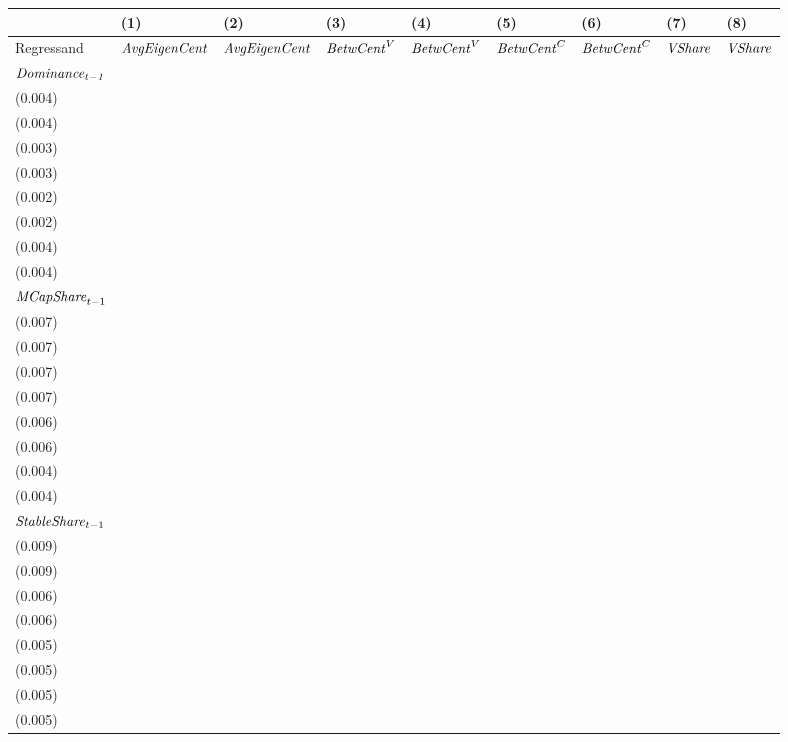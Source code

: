 \begin{tabular}{lllllllll}
\toprule
{} &                                  (1) &                                  (2) &                                  (3) &                                  (4) &                                 (5) &                                 (6) &                                 (7) &                                 (8) \\
\midrule
Regressand                   &                 ${\it AvgEigenCent}$ &                 ${\it AvgEigenCent}$ &                   ${\it BetwCent}^V$ &                   ${\it BetwCent}^V$ &                  ${\it BetwCent}^C$ &                  ${\it BetwCent}^C$ &                      ${\it VShare}$ &                      ${\it VShare}$ \\
$\it Dominance_{t-1}$        &   \makecell{$0.713^{***}$ \\(0.004)} &   \makecell{$0.713^{***}$ \\(0.004)} &   \makecell{$0.825^{***}$ \\(0.003)} &   \makecell{$0.825^{***}$ \\(0.003)} &  \makecell{$0.926^{***}$ \\(0.002)} &  \makecell{$0.926^{***}$ \\(0.002)} &  \makecell{$0.717^{***}$ \\(0.004)} &  \makecell{$0.717^{***}$ \\(0.004)} \\
${{\it MCapShare}}_{t-1}$    &  \makecell{$-0.031^{***}$ \\(0.007)} &  \makecell{$-0.032^{***}$ \\(0.007)} &   \makecell{$0.172^{***}$ \\(0.007)} &   \makecell{$0.171^{***}$ \\(0.007)} &  \makecell{$0.085^{***}$ \\(0.006)} &  \makecell{$0.084^{***}$ \\(0.006)} &  \makecell{$0.055^{***}$ \\(0.004)} &  \makecell{$0.055^{***}$ \\(0.004)} \\
${{\it StableShare}}_{t-1}$  &   \makecell{$0.169^{***}$ \\(0.009)} &   \makecell{$0.169^{***}$ \\(0.009)} &     \makecell{$-0.007^{}$ \\(0.006)} &     \makecell{$-0.007^{}$ \\(0.006)} &    \makecell{$-0.002^{}$ \\(0.005)} &    \makecell{$-0.002^{}$ \\(0.005)} &  \makecell{$0.117^{***}$ \\(0.005)} &  \makecell{$0.117^{***}$ \\(0.005)} \\

\end{tabular}

